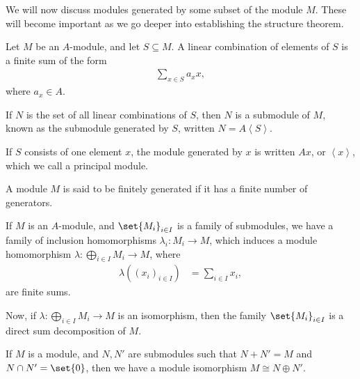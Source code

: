 \documentclass[10pt]{mypackage}
\begin{document}
We will now discuss modules generated by some subset of the module $M$. These will become important as we go deeper into establishing the structure theorem.
\begin{definition}
  Let $M$ be an $A$-module, and let $S\subseteq M$. A linear combination of elements of $S$ is a finite sum of the form
  \begin{align*}
    \sum_{x\in S}a_x x,
  \end{align*}
  where $a_x\in A$.\newline

  If $N$ is the set of all linear combinations of $S$, then $N$ is a submodule of $M$, known as the submodule generated by $S$, written $N = A\left\langle S \right\rangle$.\newline

  If $S$ consists of one element $x$, the module generated by $x$ is written $Ax$, or $\left\langle x \right\rangle$, which we call a principal module.
\end{definition}
\begin{definition}
  A module $M$ is said to be finitely generated if it has a finite number of generators.
\end{definition}
If $M$ is an $A$-module, and $\set{M_i}_{i\in I}$ is a family of submodules, we have a family of inclusion homomorphisms $\lambda_i\colon M_i\rightarrow M$, which induces a module homomorphism $\lambda\colon \bigoplus_{i\in I}M_i\rightarrow M$, where
\begin{align*}
  \lambda\left( \left( x_i \right)_{i\in I} \right) &= \sum_{i\in I}x_i,
\end{align*}
are finite sums.\newline

Now, if $\lambda\colon \bigoplus_{i\in I}M_i\rightarrow M$ is an isomorphism, then the family $\set{M_i}_{i\in I}$ is a direct sum decomposition of $M$.\newline

If $M$ is a module, and $N,N'$ are submodules such that $N + N' = M$ and $N\cap N' = \set{0}$, then we have a module isomorphism $M\cong N\oplus N'$.
\end{document}

